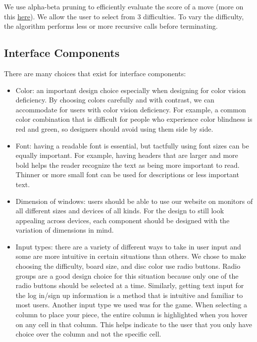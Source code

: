 \documentclass{article}
\begin{document}
We use alpha-beta pruning to efficiently evaluate the score of a move (more on this \href{https://en.wikipedia.org/wiki/Alpha%E2%80%93beta_pruning}{here}). We allow the user to select from 3 difficulties. To vary the difficulty, the algorithm performs less or more recursive calls before terminating.

\subsection{Interface Components}
There are many choices that exist for interface components:
\begin{itemize}
  \item Color: an important design choice especially when designing for color vision deficiency. By choosing colors carefully and with contrast, we can accommodate for users with color vision deficiency. For example, a common color combination that is difficult for people who experience color blindness is red and green, so designers should avoid using them side by side.
  \item Font: having a readable font is essential, but tactfully using font sizes can be equally important. For example, having headers that are larger and more bold helps the reader recognize the text as being more important to read. Thinner or more small font can be used for descriptions or less important text.
  \item Dimension of windows: users should be able to use our website on monitors of all different sizes and devices of all kinds. For the design to still look appealing across devices, each component should be designed with the variation of dimensions in mind.
  \item Input types: there are a variety of different ways to take in user input and some are more intuitive in certain situations than others. We chose to make choosing the difficulty, board size, and disc color use radio buttons. Radio groups are a good design choice for this situation because only one of the radio buttons should be selected at a time. Similarly, getting text input for the log in/sign up information is a method that is intuitive and familiar to most users. Another input type we used was for the game. When selecting a column to place your piece, the entire column is highlighted when you hover on any cell in that column. This helps indicate to the user that you only have choice over the column and not the specific cell.
\end{itemize} 
\end{document}
